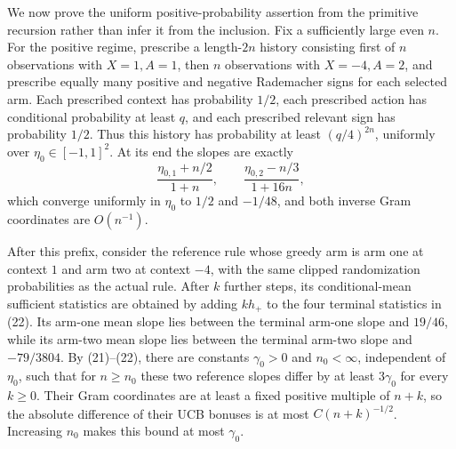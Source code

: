We now prove the uniform positive-probability assertion from the primitive recursion rather than infer it from the inclusion. Fix a sufficiently large even \(n\). For the positive regime, prescribe a length-\(2n\) history consisting first of \(n\) observations with \(X=1,A=1\), then \(n\) observations with \(X=-4,A=2\), and prescribe equally many positive and negative Rademacher signs for each selected arm. Each prescribed context has probability \(1/2\), each prescribed action has conditional probability at least \(q\), and each prescribed relevant sign has probability \(1/2\). Thus this history has probability at least \((q/4)^{2n}\), uniformly over \(\eta_0\in[-1,1]^2\). At its end the slopes are exactly
\[
 \frac{\eta_{0,1}+n/2}{1+n},\qquad
 \frac{\eta_{0,2}-n/3}{1+16n}, \tag{22}
\]
which converge uniformly in \(\eta_0\) to \(1/2\) and \(-1/48\), and both inverse Gram coordinates are \(O(n^{-1})\).

After this prefix, consider the reference rule whose greedy arm is arm one at context \(1\) and arm two at context \(-4\), with the same clipped randomization probabilities as the actual rule. After \(k\) further steps, its conditional-mean sufficient statistics are obtained by adding \(kh_+\) to the four terminal statistics in (22). Its arm-one mean slope lies between the terminal arm-one slope and \(19/46\), while its arm-two mean slope lies between the terminal arm-two slope and \(-79/3804\). By (21)--(22), there are constants \(\gamma_0>0\) and \(n_0<\infty\), independent of \(\eta_0\), such that for \(n\geq n_0\) these two reference slopes differ by at least \(3\gamma_0\) for every \(k\geq0\). Their Gram coordinates are at least a fixed positive multiple of \(n+k\), so the absolute difference of their UCB bonuses is at most \(C(n+k)^{-1/2}\). Increasing \(n_0\) makes this bound at most \(\gamma_0\).

